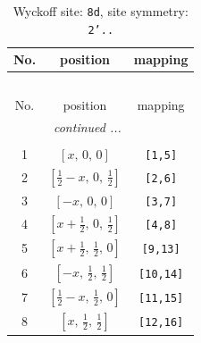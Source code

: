 \documentclass[fleqn,8pt]{jsarticle}
\begin{document}
\begin{longtable}{ccc}
\caption{Wyckoff site: {\tt 8d}, site symmetry: {\tt 2'..}}
 \\
 \hline \hline
No. & position & mapping \\ \hline \endfirsthead

\multicolumn{2}{l}{\tablename\ \thetable{}} \\
 \hline \hline
No. & position & mapping \\ \hline \endhead

 \hline \hline
\multicolumn{2}{r}{\footnotesize\it continued ...} \\ \endfoot

 \hline \hline
\multicolumn{2}{r}{} \\ \endlastfoot

1 & $\left[ x,\, 0,\, 0 \right]$ & {\tt [1,5]} \\ \hline
2 & $\left[ \frac{1}{2} - x,\, 0,\, \frac{1}{2} \right]$ & {\tt [2,6]} \\ \hline
3 & $\left[ - x,\, 0,\, 0 \right]$ & {\tt [3,7]} \\ \hline
4 & $\left[ x + \frac{1}{2},\, 0,\, \frac{1}{2} \right]$ & {\tt [4,8]} \\ \hline
5 & $\left[ x + \frac{1}{2},\, \frac{1}{2},\, 0 \right]$ & {\tt [9,13]} \\ \hline
6 & $\left[ - x,\, \frac{1}{2},\, \frac{1}{2} \right]$ & {\tt [10,14]} \\ \hline
7 & $\left[ \frac{1}{2} - x,\, \frac{1}{2},\, 0 \right]$ & {\tt [11,15]} \\ \hline
8 & $\left[ x,\, \frac{1}{2},\, \frac{1}{2} \right]$ & {\tt [12,16]} \\
\end{longtable}
\renewcommand{\arraystretch}{1.2}
\end{document}
